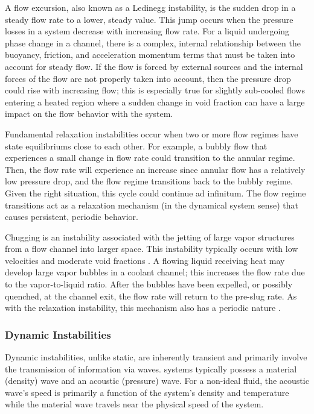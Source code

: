 A flow excursion, also known as a Ledinegg instability, is the sudden drop in a steady flow rate to a lower, steady value.
This jump occurs when the pressure losses in a system decrease with increasing flow rate.
For a liquid undergoing phase change in a channel, there is a complex, internal relationship between the buoyancy, friction, and acceleration momentum terms that must be taken into account for steady flow.
If the flow is forced by external sources and the internal forces of the flow are not properly taken into account, then the pressure drop could rise with increasing flow; this is especially true for slightly sub-cooled flows entering a heated region where a sudden change in void fraction can have a large impact on the flow behavior with the system.

Fundamental relaxation instabilities occur when two or more flow regimes have state equilibriums close to each other.
For example, a bubbly flow that experiences a small change in flow rate could transition to the annular regime.
Then, the flow rate will experience an increase since annular flow has a relatively low pressure drop, and the flow regime transitions back to the bubbly regime.
Given the right situation, this cycle could continue ad infinitum.
The flow regime transitions act as a relaxation mechanism (in the dynamical system sense) that causes persistent, periodic behavior.

Chugging is an instability associated with the jetting of large vapor structures from a flow channel into larger space.
This instability typically occurs with low velocities and moderate void fractions \cite{tong_boiling_1997-1}.
A flowing liquid receiving heat may develop large vapor bubbles in a coolant channel; this increases the flow rate due to the vapor-to-liquid ratio.
After the bubbles have been expelled, or possibly quenched, at the channel exit, the flow rate will return to the pre-slug rate.
As with the relaxation instability, this mechanism also has a periodic nature \cite{aritomi_geysering_1993-1}.



\subsubsection{Dynamic Instabilities}
Dynamic instabilities, unlike static, are inherently transient and primarily involve the transmission of information via waves.
\THs systems typically possess a material (density) wave and an acoustic (pressure) wave.
For a non-ideal fluid, the acoustic wave's speed is primarily a function of the system's density and temperature while the material wave travels near the physical speed of the system.

